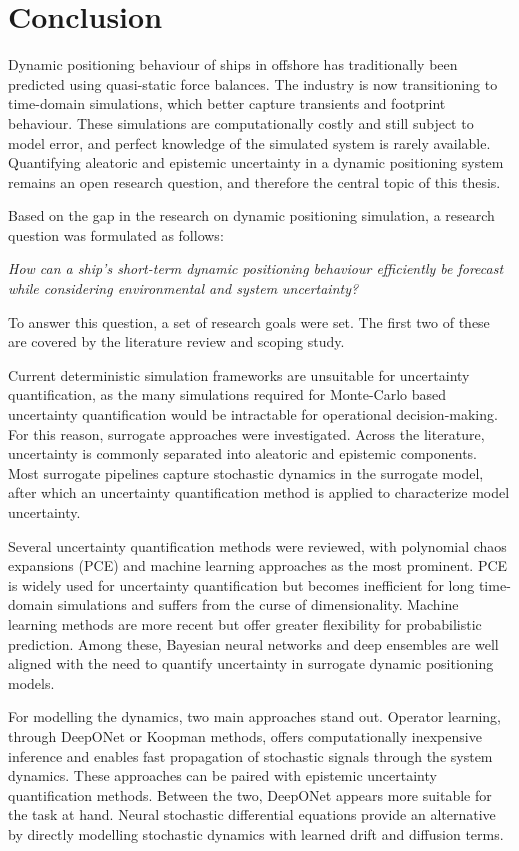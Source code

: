\chapter{Conclusion}
\label{chapter:conclusion}
Dynamic positioning behaviour of ships in offshore has traditionally been predicted using quasi-static force balances.
The industry is now transitioning to time-domain simulations, which better capture transients and footprint behaviour.
These simulations are computationally costly and still subject to model error, and perfect knowledge of the simulated
system is rarely available. Quantifying aleatoric and epistemic uncertainty in a dynamic positioning system remains an open research
question, and therefore the central topic of this thesis. 

Based on the gap in the research on dynamic positioning simulation, a research question was formulated as follows:

\emph{How can a ship's short-term dynamic positioning behaviour efficiently be forecast while considering environmental and system uncertainty?}

To answer this question, a set of research goals were set. The first two of these are covered by the literature review
and scoping study. 

Current deterministic simulation frameworks are unsuitable for uncertainty quantification, as the many simulations
required for Monte-Carlo based uncertainty quantification  would be intractable for operational decision-making. For this reason, surrogate approaches
were investigated. Across the literature, uncertainty is commonly separated into aleatoric and epistemic components.
Most surrogate pipelines capture stochastic dynamics in the surrogate model, after which an uncertainty quantification method is applied to
characterize model uncertainty.

Several uncertainty quantification methods were reviewed, with polynomial chaos expansions (PCE) and machine learning approaches as the most
prominent. PCE is widely used for uncertainty quantification but becomes inefficient for long time-domain simulations and suffers from the curse
of dimensionality. Machine learning methods are more recent but offer greater flexibility for probabilistic prediction.
Among these, Bayesian neural networks and deep ensembles are well aligned with the need to quantify uncertainty in
surrogate dynamic positioning models.

For modelling the dynamics, two main approaches stand out. Operator learning, through DeepONet or Koopman methods, offers
computationally inexpensive inference and enables fast propagation of stochastic signals through the system dynamics.
These approaches can be paired with epistemic uncertainty quantification methods. Between the two, DeepONet appears more suitable for the task
at hand. Neural stochastic differential equations provide an alternative by directly modelling stochastic dynamics with
learned drift and diffusion terms. 

